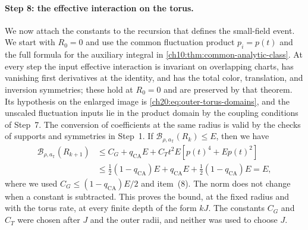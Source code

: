 \paragraph{Step 8: the effective interaction on the torus.}
We now attach the constants to the recursion that defines the small-field event. We start with $R_0=0$ and use the common fluctuation product $p_i=p(t)$ and the full formula for the auxiliary integral in \cref{ch10:thm:common-analytic-class}. At every step the input effective interaction is invariant on overlapping charts, has vanishing first derivatives at the identity, and has the total color, translation, and inversion symmetries; these hold at $R_0=0$ and are preserved by that theorem. Its hypothesis on the enlarged image is \eqref{ch20:eq:outer-torus-domains}, and the unscaled fluctuation inputs lie in the product domain by the coupling conditions of Step~7. The conversion of coefficients at the same radius is valid by the checks of supports and symmetries in Step~1. If $\mathcal B_{\rho,a_{\mathbb T}}(R_k)\le E$, then we have
\begin{equation}\label{ch20:eq:actual-torus-ball}
 \begin{split}
 \mathcal B_{\rho,a_{\mathbb T}}(R_{k+1})
 &\le C_G+q_{\mathrm{CA}}E+C_Tt^2E[p(t)^4+Ep(t)^2]\\
 &\le\frac12(1-q_{\mathrm{CA}})E+q_{\mathrm{CA}}E+\frac12(1-q_{\mathrm{CA}})E=E,
 \end{split}
\end{equation}
where we used $C_G\le(1-q_{\mathrm{CA}})E/2$ and item~(8). The norm does not change when a constant is subtracted. This proves the bound, at the fixed radius and with the torus rate, at every finite depth of the form $kJ$. The constants $C_G$ and $C_T$ were chosen after $J$ and the outer radii, and neither was used to choose $J$.

